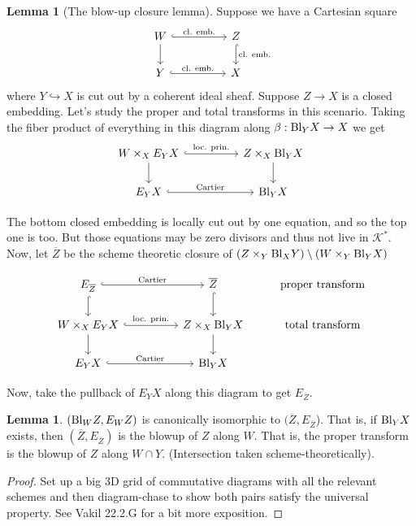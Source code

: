 \documentclass[10pt,reqno]{amsart}
\theoremstyle{definition}
\newtheorem{lemma}[theorem]{Lemma}
\theoremstyle{remark}
\numberwithin{equation}{section}
\numberwithin{theorem}{section}
\newcommand*{\red}{\textcolor{red}}
\newcommand{\KK}{{\mathscr K}}
\newcommand{\Bl}{\textup{Bl}}
\begin{document}
\begin{lemma}[The blow-up closure lemma] Suppose we have a Cartesian square
\[\begin{tikzcd}
W \arrow[rr, hook, "\textup{cl. emb.}"] \arrow[d] & &Z \arrow[d, hook, "\textup{cl. emb.}"] \\
Y \arrow[rr, hook, "\textup{cl. emb.}"] & &X 
\end{tikzcd}
\]
where $Y \hookrightarrow X$ is cut out by a coherent ideal sheaf. %
Suppose $Z \to X$ is a closed embedding. Let's study the proper and total transforms in this scenario. Taking the fiber product of everything in this diagram along $\beta: \Bl_Y X \to X$ we get
\[\begin{tikzcd}
W \times_X E_Y X \arrow[rr, hook, "\textup{loc. prin.}"] \arrow[d] & &Z \times_X \Bl_Y X \arrow[d] \\
E_Y X \arrow[rr, hook, "\textup{Cartier}"] & & \Bl_Y X 
\end{tikzcd}
\]
\end{lemma}

The bottom closed embedding is locally cut out by one equation, and so the top one is too. But those equations may be zero divisors and thus not live in $\KK^*$. Now, let $\overline{Z}$ be the scheme theoretic closure of $(Z \times_Y \Bl_X Y) \setminus (W \times_Y \Bl_Y X)$

\[\begin{tikzcd}
E_{\overline{Z}} \arrow[rr, hook, "\textup{Cartier}"] \arrow[d, hook]& & \overline{Z} \arrow[d, hook] & \textup{proper transform}\\
W \times_X E_Y X \arrow[rr, hook, "\textup{loc. prin.}"] \arrow[d] & &Z \times_X \Bl_Y X \arrow[d] & \textup{total transform}\\
E_Y X \arrow[rr, hook, "\textup{Cartier}"] & & \Bl_Y X & 
\end{tikzcd}
\]

Now, take the pullback of $E_Y X$ along this diagram to get $E_{\overline{Z}}$. 

\begin{lemma} $(\Bl_W Z, E_W Z)$ is canonically isomorphic to $(\overline{Z},E_{\overline{Z}}$). That is, if $\Bl_Y X$ exists, then $(\overline{Z}, E_{\overline{Z}})$ is the blowup of $Z$ along $W$. That is, the proper transform is the blowup of $Z$ along $W \cap Y$. (Intersection taken scheme-theoretically). 
\end{lemma}
\begin{proof} Set up a big 3D grid of commutative diagrams with all the relevant schemes and then diagram-chase to show both pairs satisfy the universal property. See Vakil 22.2.G for a bit more exposition.
\end{proof}
\end{document}
